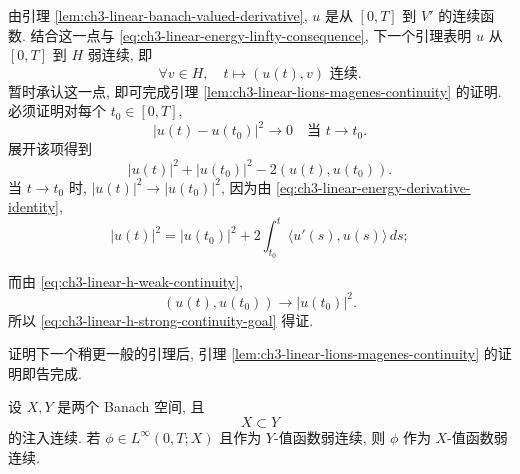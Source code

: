 由引理 \ref{lem:ch3-linear-banach-valued-derivative}, $u$ 是从 $[0,T]$ 到 $V'$ 的连续函数. 结合这一点与 \eqref{eq:ch3-linear-energy-linfty-consequence}, 下一个引理表明 $u$ 从 $[0,T]$ 到 $H$ 弱连续, 即
\begin{equation}
\forall v\in H,\quad t\longmapsto(u(t),v)\text{ 连续}.
\label{eq:ch3-linear-h-weak-continuity}
\end{equation}
暂时承认这一点, 即可完成引理 \ref{lem:ch3-linear-lions-magenes-continuity} 的证明. 必须证明对每个 $t_0\in[0,T]$,
\begin{equation}
|u(t)-u(t_0)|^2\longrightarrow0
\quad\text{当 }t\to t_0.
\label{eq:ch3-linear-h-strong-continuity-goal}
\end{equation}
展开该项得到
\[
|u(t)|^2+|u(t_0)|^2-2(u(t),u(t_0)).
\]
当 $t\to t_0$ 时, $|u(t)|^2\to|u(t_0)|^2$, 因为由 \eqref{eq:ch3-linear-energy-derivative-identity},
\[
|u(t)|^2=|u(t_0)|^2+2\int_{t_0}^{t}\langle u'(s),u(s)\rangle\,ds;
\]

\hypertarget{chapter-03-page-193}{}
而由 \eqref{eq:ch3-linear-h-weak-continuity},
\[
(u(t),u(t_0))\longrightarrow|u(t_0)|^2.
\]
所以 \eqref{eq:ch3-linear-h-strong-continuity-goal} 得证.

证明下一个稍更一般的引理后, 引理 \ref{lem:ch3-linear-lions-magenes-continuity} 的证明即告完成.

\begin{Lemma}
\label{lem:ch3-linear-weak-continuity-transfer}
设 $X,Y$ 是两个 Banach 空间, 且
\begin{equation}
X\subset Y
\label{eq:ch3-linear-banach-continuous-injection}
\end{equation}
的注入连续. 若 $\phi\in L^\infty(0,T;X)$ 且作为 $Y$-值函数弱连续, 则 $\phi$ 作为 $X$-值函数弱连续.
\end{Lemma}


